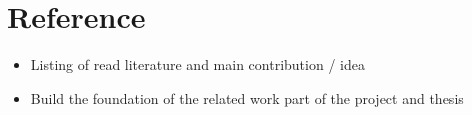 \documentclass[11pt,a4paper]{article}
\begin{document}
	
\section{Reference}

\begin{itemize}
\item Listing of read literature and main contribution / idea
\item Build the foundation of the related work part of the project and thesis
\end{itemize}
\end{document}
